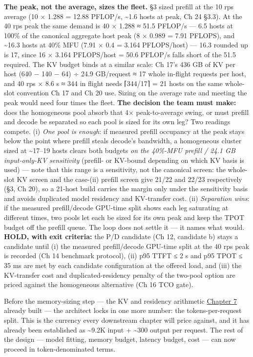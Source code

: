 \textbf{The peak, not the average, sizes the fleet.} §3 sized prefill at
the 10 rps average (10 × 1.288 = 12.88 PFLOP/s, \textasciitilde1.6 hosts
at peak, Ch 24 §3.3). At the 40 rps peak the same demand is 40 × 1.288 ≈
51.5 PFLOP/s --- 6.5 hosts at 100\% of the canonical aggregate host peak
(8 × 0.989 = 7.91 PFLOPS), and \textasciitilde16.3 hosts at 40\% MFU
(7.91 × 0.4 = 3.164 PFLOPS/host) --- 16.3 rounded up is 17, since 16 ×
3.164 PFLOPS/host = 50.6 PFLOP/s falls short of the 51.5 required. The
KV budget binds at a similar scale: Ch 17's 436 GB of KV per host (640 −
140 − 64) ÷ 24.9 GB/request ≈ 17 whole in-flight requests per host, and
40 rps × 8.6 s ≈ 344 in flight needs ⌈344/17⌉ = 21 hosts on the same
whole-slot convention Ch 17 and Ch 20 use. Sizing on the average rate
and meeting the peak would need four times the fleet. \textbf{The
decision the team must make:} does the homogeneous pool absorb that 4×
peak-to-average swing, or must prefill and decode be separated so each
pool is sized for its own leg? Two readings compete. (i) \emph{One pool
is enough}: if measured prefill occupancy at the peak stays below the
point where prefill steals decode's bandwidth, a homogeneous cluster
sized at \textasciitilde17--19 hosts clears both budgets \emph{on the
40\%-MFU prefill / 24.1 GB input-only-KV sensitivity} (prefill- or
KV-bound depending on which KV basis is used) --- note that this range
is a sensitivity, not the canonical screen: the whole-slot KV screen and
the case-(ii) prefill screen give 21/22 and 22/23 respectively (§3, Ch
20), so a 21-host build carries the margin only under the sensitivity
basis and avoids duplicated model residency and KV-transfer cost. (ii)
\emph{Separation wins}: if the measured prefill/decode GPU-time split
shows each leg saturating at different times, two pools let each be
sized for its own peak and keep the TPOT budget off the prefill queue.
The loop does not settle it --- it names what would. \textbf{HOLD, with
exit criteria:} the P/D candidate (Ch 12, candidate b) stays a candidate
until (i) the measured prefill/decode GPU-time split at the 40 rps peak
is recorded (Ch 14 benchmark protocol), (ii) p95 TTFT ≤ 2 s and p95 TPOT
≤ 35 ms are met by each candidate configuration at the offered load, and
(iii) the KV-transfer cost and duplicated-residency penalty of the
two-pool option are priced against the homogeneous alternative (Ch 16
TCO gate).

Before the memory-sizing step --- the KV and residency arithmetic
\hyperref[chap:7]{Chapter 7} already built --- the architect locks in one more number: the
tokens-per-request split. This is the currency every downstream chapter
will price against, and it has already been established as
\textasciitilde9.2K input + \textasciitilde300 output per request. The
rest of the design --- model fitting, memory budget, latency budget,
cost --- can now proceed in token-denominated terms.
